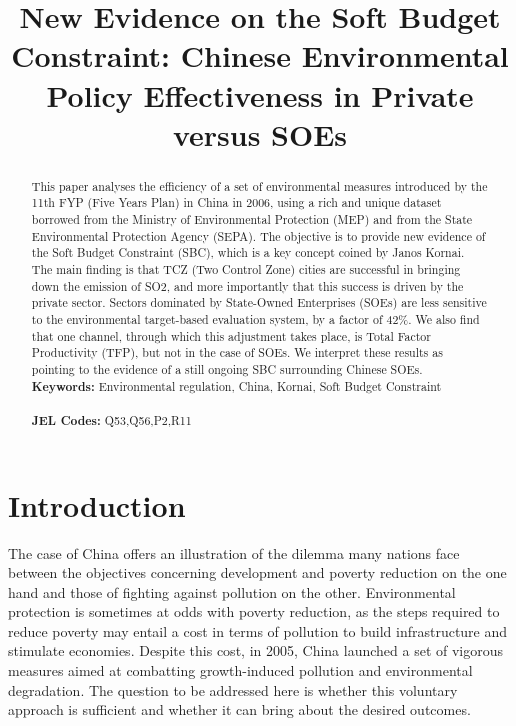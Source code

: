 \documentclass[12pt]{article}
\begin{document}
\begin{titlepage}


\title{New Evidence on the Soft Budget Constraint: Chinese Environmental Policy Effectiveness in Private versus SOEs}
\author{}


\date{}

\maketitle
\begin{abstract}
\noindent This paper analyses the efficiency of a set of environmental measures introduced by the 11th FYP (Five Years Plan) in China in 2006, using a rich and unique dataset borrowed from the Ministry of Environmental Protection (MEP) and from the State Environmental Protection Agency (SEPA). The objective is to provide new evidence of the Soft Budget Constraint (SBC), which is a key concept coined by Janos Kornai. The main finding is that TCZ (Two Control Zone) cities are successful in bringing down the emission of SO2, and more importantly that this success is driven by the private sector. Sectors dominated by State-Owned Enterprises (SOEs) are less sensitive to the environmental target-based evaluation system, by a factor of 42\%. We also find that one channel, through which this adjustment takes place, is Total Factor Productivity (TFP), but not in the case of SOEs. We interpret these results as pointing to the evidence of a still ongoing SBC surrounding Chinese SOEs.  
\vspace{0em}\\
\noindent\textbf{Keywords:} Environmental regulation, China, Kornai, Soft Budget Constraint\\
\vspace{0em}\\
\noindent\textbf{JEL Codes:} Q53,Q56,P2,R11
\\

\bigskip
\end{abstract}
\setcounter{page}{0}
\thispagestyle{empty}
\end{titlepage}
\pagebreak \newpage

\doublespacing

\section{Introduction} \label{sec:introduction}

The case of China offers an illustration of the dilemma many nations face between the objectives concerning development and poverty reduction on the one hand and those of fighting against pollution on the other. Environmental protection is sometimes at odds with poverty reduction, as the steps required to reduce poverty may entail a cost in terms of pollution to build infrastructure and stimulate economies. Despite this cost, in 2005, China launched a set of vigorous measures aimed at combatting growth-induced pollution and environmental degradation. The question to be addressed here is whether this voluntary approach is sufficient and whether it can bring about the desired outcomes. 
\end{document}
